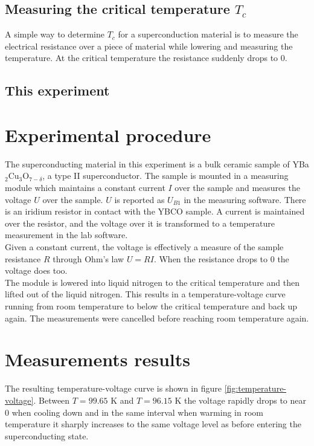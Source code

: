 \documentclass[a4paper,twoside=false,abstract=false,numbers=noenddot,
titlepage=false,headings=small,parskip=half,version=last]{scrartcl}
\begin{document}

\subsection{Measuring the critical temperature $T_c$}
A simple way to determine $T_c$ for a superconduction material is to measure the electrical resistance over a piece of material while lowering and measuring the temperature.
At the critical temperature the resistance suddenly drops to $0$.

\subsection{This experiment}


\section{Experimental procedure}
The superconducting material in this experiment is a bulk ceramic sample of YBa$_2$Cu$_3$O$_{7-\delta}$, a type II superconductor.
The sample is mounted in a measuring module which maintains a constant current $I$ over the sample and measures the voltage $U$ over the sample. $U$ is reported as $U_{B1}$ in the measuring software. There is an iridium resistor in contact with the YBCO sample. A current is maintained over the resistor, and the voltage over it is transformed to a temperature measurement in the lab software.\\
Given a constant current, the voltage is effectively a measure of the sample resistance $R$ through Ohm's law $U=RI$. When the resistance drops to 0 the voltage does too.\\
The module is lowered into liquid nitrogen to the critical temperature and then lifted out of the liquid nitrogen.
This results in a temperature-voltage curve running from room temperature to below the critical temperature and back up again. The measurements were cancelled before reaching room temperature again.

\section{Measurements results}
The resulting temperature-voltage curve is shown in figure \ref{fig:temperature-voltage}. Between $T = 99.65$ K and $T = 96.15$ K the voltage rapidly drops to near 0 when cooling down and in the same interval when warming in room temperature it sharply increases to the same voltage level as before entering the superconducting state.
\end{document}
